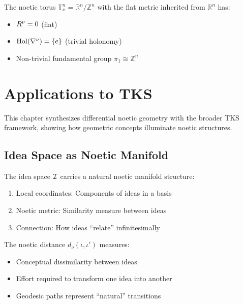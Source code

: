 \begin{example}
\label{ex:flat-torus}
The noetic torus $\mathbb{T}^n_\nu = \mathbb{R}^n/\mathbb{Z}^n$ with the flat
metric inherited from $\mathbb{R}^n$ has:
\begin{itemize}
    \item $R^\nu = 0$ (flat)
    \item $\mathrm{Hol}(\nabla^\nu) = \{e\}$ (trivial holonomy)
    \item Non-trivial fundamental group $\pi_1 \cong \mathbb{Z}^n$
\end{itemize}
\end{example}


\chapter{Applications to TKS}
\label{ch:geometry-tks-applications}

\begin{tcolorbox}[colback=green!5!white,colframe=green!75!black,title=Synthesis]
This chapter synthesizes differential noetic geometry with the broader TKS
framework, showing how geometric concepts illuminate noetic structures.
\end{tcolorbox}

\section{Idea Space as Noetic Manifold}

\begin{construction}
\label{constr:geometric-idea-space}
The idea space $\mathcal{I}$ carries a natural noetic manifold structure:
\begin{enumerate}[label=(\roman*)]
    \item Local coordinates: Components of ideas in a basis
    \item Noetic metric: Similarity measure between ideas
    \item Connection: How ideas ``relate'' infinitesimally
\end{enumerate}
\end{construction}

\begin{proposition}
\label{prop:noetic-distance-interpretation}
The noetic distance $d_\nu(\iota, \iota')$ measures:
\begin{itemize}
    \item Conceptual dissimilarity between ideas
    \item Effort required to transform one idea into another
    \item Geodesic paths represent ``natural'' transitions
\end{itemize}
\end{proposition}

